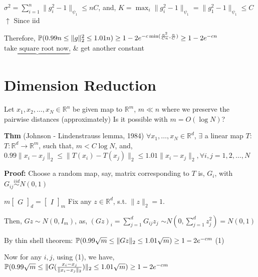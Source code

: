 \documentclass[12pt]{article}
\begin{document}
$\sigma^2 = \sum_{i=1}^n \|g_i^2 - 1\|_{\psi_1} \leq n C$, and, $K = \max_i \|g_i^2 - 1\|_{\psi_1} = \|g_1^2 - 1\|_{\psi_1} \leq C$
\hspace*{8cm} $\uparrow$
\hspace*{8cm} Since iid

Therefore, $\mathbb{P}(0.99 n \leq \|g\|_2^2 \leq 1.01 n) \geq 1 - 2e^{-c \min(\frac{n^2}{Cn}, \frac{n}{C})} \geq 1 - 2e^{-cn}$
\hspace*{2cm} $\underbrace{\text{take square root now,}}$
\hspace*{2cm} \& get another constant

\section*{Dimension Reduction}

Let $x_1, x_2, \ldots, x_N \in \mathbb{R}^n$ be given map to $\mathbb{R}^m$, $m \ll n$
where we preserve the pairwise distances (approximately)
Is it possible with $m = O(\log N)$?

\textbf{Thm} (Johnson - Lindenstrauss lemma, 1984) $\forall x_1, \ldots, x_N \in \mathbb{R}^d$, $\exists$ a linear map $T$:
$T: \mathbb{R}^d \to \mathbb{R}^m$, such that, $m < C \log N$, and,
$0.99 \|x_i - x_j\|_2 \leq \|T(x_i) - T(x_j)\|_2 \leq 1.01 \|x_i - x_j\|_2, \forall i,j=1,2,\ldots,N$

\textbf{Proof:} Choose a random map, say, matrix corresponding to $T$ is, $G_i$, with $G_{ij} \stackrel{iid}{\sim} N(0,1)$

$m \begin{bmatrix} G \end{bmatrix}_d = \begin{bmatrix} I \end{bmatrix}_m$ \hspace{2cm} Fix any $z \in \mathbb{R}^d$, s.t. $\|z\|_2 = 1$.

\hspace{4cm} Then, $Gz \sim N(0,I_m)$, as, $(Gz)_i = \sum_{j=1}^d G_{ij} z_j$
\hspace{7cm} $\sim N(0, \sum_{j=1}^d z_j^2) = N(0,1)$

By thin shell theorem:
$\mathbb{P}(0.99 \sqrt{m} \leq \|Gz\|_2 \leq 1.01 \sqrt{m}) \geq 1 - 2e^{-cm}$ \hspace{2cm} (1)

Now for any $i,j$, using (1), we have, $\mathbb{P}(0.99 \sqrt{m} \leq \|G(\frac{x_i-x_j}{\|x_i-x_j\|_2})\|_2 \leq 1.01 \sqrt{m}) \geq 1 - 2e^{-cm}$
\end{document}
